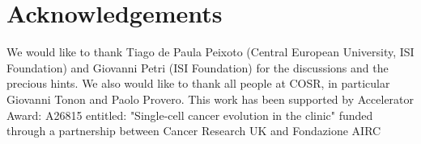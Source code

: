 \documentclass[10pt]{article}
\begin{document}
\section*{Acknowledgements}

We would like to thank Tiago de Paula Peixoto (Central European University, ISI Foundation) and Giovanni Petri (ISI Foundation) for the discussions and the precious hints. We also would like to thank all people at COSR, in particular Giovanni Tonon and Paolo Provero.
This work has been supported by Accelerator Award: A26815 entitled:  "Single-cell cancer evolution in the clinic" funded through a partnership between Cancer Research UK and Fondazione AIRC





\end{document}
